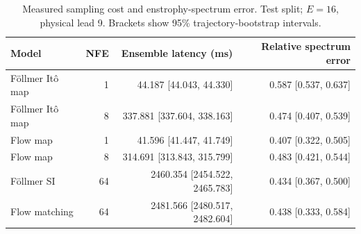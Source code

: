 \begin{table}[t]
\centering
\small
\setlength{\tabcolsep}{3pt}
\caption{Measured sampling cost and enstrophy-spectrum error. Test split; $E=16$, physical lead 9. Brackets show 95\% trajectory-bootstrap intervals.}
\label{tab:map-cost}
\begin{tabular}{lrrr}
\toprule
Model & NFE & Ensemble latency (ms) & Relative spectrum error \\
\midrule
Föllmer Itô map & 1 & 44.187 [44.043, 44.330] & 0.587 [0.537, 0.637] \\
Föllmer Itô map & 8 & 337.881 [337.604, 338.163] & 0.474 [0.407, 0.539] \\
\addlinespace
Flow map & 1 & 41.596 [41.447, 41.749] & 0.407 [0.322, 0.505] \\
Flow map & 8 & 314.691 [313.843, 315.799] & 0.483 [0.421, 0.544] \\
\addlinespace
Föllmer SI & 64 & 2460.354 [2454.522, 2465.783] & 0.434 [0.367, 0.500] \\
\addlinespace
Flow matching & 64 & 2481.566 [2480.517, 2482.604] & 0.438 [0.333, 0.584] \\
\bottomrule
\end{tabular}
\end{table}
